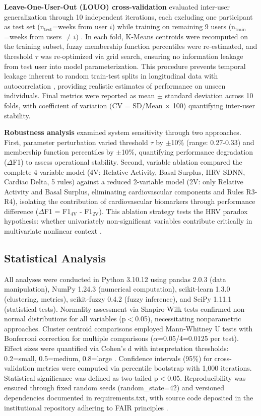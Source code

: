 \documentclass[journal,twoside,web]{ieeecolor}
\begin{document}
\textbf{Leave-One-User-Out (LOUO) cross-validation} evaluated inter-user generalization through 10 independent iterations, each excluding one participant as test set (n$_{\text{test}}$=weeks from user $i$) while training on remaining 9 users (n$_{\text{train}}$=weeks from users $\neq i$) \cite{Varoquaux2017,Poldrack2020}. In each fold, K-Means centroids were recomputed on the training subset, fuzzy membership function percentiles were re-estimated, and threshold $\tau$ was re-optimized via grid search, ensuring no information leakage from test user into model parameterization. This procedure prevents temporal leakage inherent to random train-test splits in longitudinal data with autocorrelation \cite{Rehman2024LOSO}, providing realistic estimates of performance on unseen individuals. Final metrics were reported as mean $\pm$ standard deviation across 10 folds, with coefficient of variation (CV = SD/Mean $\times$ 100) quantifying inter-user stability.

\textbf{Robustness analysis} examined system sensitivity through two approaches. First, parameter perturbation varied threshold $\tau$ by $\pm$10\% (range: 0.27-0.33) and membership function percentiles by $\pm$10\%, quantifying performance degradation ($\Delta$F1) to assess operational stability. Second, variable ablation compared the complete 4-variable model (4V: Relative Activity, Basal Surplus, HRV-SDNN, Cardiac Delta, 5 rules) against a reduced 2-variable model (2V: only Relative Activity and Basal Surplus, eliminating cardiovascular components and Rules R3-R4), isolating the contribution of cardiovascular biomarkers through performance difference ($\Delta$F1 = F1$_{\text{4V}}$ - F1$_{\text{2V}}$). This ablation strategy tests the HRV paradox hypothesis: whether univariately non-significant variables contribute critically in multivariate nonlinear context \cite{Godkin2025Context,Marino2024ARIC}.

\subsection{Statistical Analysis}
\label{subsec:statistics}

All analyses were conducted in Python 3.10.12 using pandas 2.0.3 (data manipulation), NumPy 1.24.3 (numerical computation), scikit-learn 1.3.0 (clustering, metrics), scikit-fuzzy 0.4.2 (fuzzy inference), and SciPy 1.11.1 (statistical tests). Normality assessment via Shapiro-Wilk tests \cite{Shapiro1965} confirmed non-normal distributions for all variables (p$<$0.05), necessitating nonparametric approaches. Cluster centroid comparisons employed Mann-Whitney U tests \cite{Mann1947} with Bonferroni correction for multiple comparisons ($\alpha$=0.05/4=0.0125 per test). Effect sizes were quantified via Cohen's d with interpretation thresholds: 0.2=small, 0.5=medium, 0.8=large \cite{Cohen1988}. Confidence intervals (95\%) for cross-validation metrics were computed via percentile bootstrap with 1,000 iterations. Statistical significance was defined as two-tailed p$<$0.05. Reproducibility was ensured through fixed random seeds (random\_state=42) and versioned dependencies documented in requirements.txt, with source code deposited in the institutional repository adhering to FAIR principles \cite{Wilkinson2016}.
\end{document}
